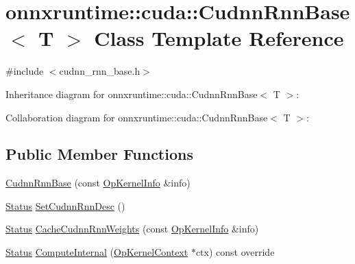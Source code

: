 \hypertarget{classonnxruntime_1_1cuda_1_1CudnnRnnBase}{}\section{onnxruntime\+:\+:cuda\+:\+:Cudnn\+Rnn\+Base$<$ T $>$ Class Template Reference}
\label{classonnxruntime_1_1cuda_1_1CudnnRnnBase}


{\ttfamily \#include $<$cudnn\+\_\+rnn\+\_\+base.\+h$>$}



Inheritance diagram for onnxruntime\+:\+:cuda\+:\+:Cudnn\+Rnn\+Base$<$ T $>$\+:


Collaboration diagram for onnxruntime\+:\+:cuda\+:\+:Cudnn\+Rnn\+Base$<$ T $>$\+:
\subsection*{Public Member Functions}
\begin{DoxyCompactItemize}
\item 
\mbox{\hyperlink{classonnxruntime_1_1cuda_1_1CudnnRnnBase_a202c5560e8d830d451742ce7fb05a867}{Cudnn\+Rnn\+Base}} (const \mbox{\hyperlink{classonnxruntime_1_1OpKernelInfo}{Op\+Kernel\+Info}} \&info)
\item 
\mbox{\hyperlink{classonnxruntime_1_1common_1_1Status}{Status}} \mbox{\hyperlink{classonnxruntime_1_1cuda_1_1CudnnRnnBase_acf8e4d67f6937aef141fee74b5d8401a}{Set\+Cudnn\+Rnn\+Desc}} ()
\item 
\mbox{\hyperlink{classonnxruntime_1_1common_1_1Status}{Status}} \mbox{\hyperlink{classonnxruntime_1_1cuda_1_1CudnnRnnBase_a8a9e22cbec1bc69d53a557a53a6fe790}{Cache\+Cudnn\+Rnn\+Weights}} (const \mbox{\hyperlink{classonnxruntime_1_1OpKernelInfo}{Op\+Kernel\+Info}} \&info)
\item 
\mbox{\hyperlink{classonnxruntime_1_1common_1_1Status}{Status}} \mbox{\hyperlink{classonnxruntime_1_1cuda_1_1CudnnRnnBase_ab7e2e0912ffc9b23069b9a2fee25aa2b}{Compute\+Internal}} (\mbox{\hyperlink{classonnxruntime_1_1OpKernelContext}{Op\+Kernel\+Context}} $\ast$ctx) const override
\end{DoxyCompactItemize}

